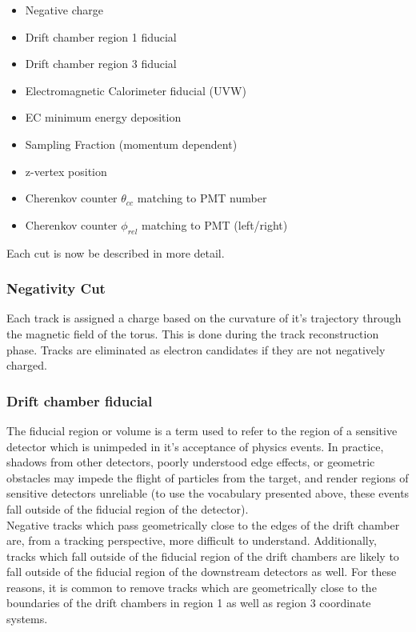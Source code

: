 \begin{itemize}
  \item{Negative charge}
  \item{Drift chamber region 1 fiducial}
  \item{Drift chamber region 3 fiducial}
  \item{Electromagnetic Calorimeter fiducial (UVW)}
  \item{EC minimum energy deposition}
  \item{Sampling Fraction (momentum dependent)}
  \item{z-vertex position}
  \item{Cherenkov counter $\theta_{cc}$ matching to PMT number}
  \item{Cherenkov counter $\phi_{rel}$ matching to PMT (left/right)}
\end{itemize}

Each cut is now be described in more detail.

\subsubsection{Negativity Cut}
Each track is assigned a charge based on the curvature of it's trajectory through the magnetic field of the torus.  This is done during the track reconstruction phase.  Tracks are eliminated as electron candidates if they are not negatively charged.

\subsubsection{Drift chamber fiducial}
The fiducial region or volume is a term used to refer to the region of a sensitive detector which is unimpeded in it's acceptance of physics events.  In practice, shadows from other detectors, poorly understood edge effects, or geometric obstacles may impede the flight of particles from the target, and render regions of sensitive detectors unreliable (to use the vocabulary presented above, these events fall outside of the fiducial region of the detector).  \\

Negative tracks which pass geometrically close to the edges of the drift chamber are, from a tracking perspective, more difficult to understand.  Additionally, tracks which fall outside of the fiducial region of the drift chambers are likely to fall outside of the fiducial region of the downstream detectors as well.  For these reasons, it is common to remove tracks which are geometrically close to the boundaries of the drift chambers in region 1 as well as region 3 coordinate systems.\\

